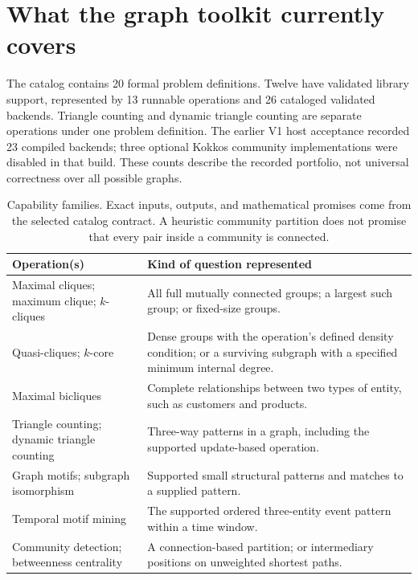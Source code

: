 \documentclass[11pt,a4paper]{article}
\begin{document}
\section{What the graph toolkit currently covers}

The catalog contains 20 formal problem definitions. Twelve have validated library
support, represented by 13 runnable operations and 26 cataloged validated
backends. Triangle counting and dynamic triangle counting are separate operations
under one problem definition. The earlier V1 host acceptance recorded 23 compiled
backends; three optional Kokkos community implementations were disabled in that
build. These counts describe the recorded portfolio, not universal correctness
over all possible graphs.~\cite{catalog,release}

\begin{table}[htbp]
\centering\small
\begin{tabularx}{\linewidth}{@{}P{4.1cm}Y@{}}
\toprule
Operation(s) & Kind of question represented \\
\midrule
Maximal cliques; maximum clique; $k$-cliques & All full mutually connected
groups; a largest such group; or fixed-size groups. \\
Quasi-cliques; $k$-core & Dense groups with the operation's defined density
condition; or a surviving subgraph with a specified minimum internal degree. \\
Maximal bicliques & Complete relationships between two types of entity,
such as customers and products. \\
Triangle counting; dynamic triangle counting & Three-way patterns in a graph,
including the supported update-based operation. \\
Graph motifs; subgraph isomorphism & Supported small structural patterns and
matches to a supplied pattern. \\
Temporal motif mining & The supported ordered three-entity event pattern
within a time window. \\
Community detection; betweenness centrality & A connection-based partition;
or intermediary positions on unweighted shortest paths. \\
\bottomrule
\end{tabularx}
\caption{Capability families. Exact inputs, outputs, and mathematical promises
come from the selected catalog contract. A heuristic community partition does
not promise that every pair inside a community is connected.}
\end{table}
\end{document}
